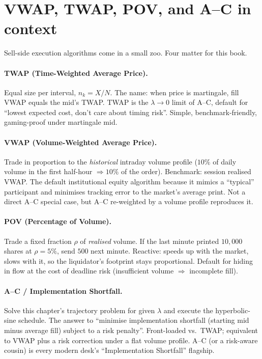 \section{VWAP, TWAP, POV, and A--C in context}
\label{sec:ac_taxonomy}

Sell-side execution algorithms come in a small zoo. Four matter
for this book.

\paragraph{TWAP (Time-Weighted Average Price).} Equal size
per interval, $n_k = X/N$. The name: when price is martingale, fill
VWAP equals the mid's TWAP. TWAP is the $\lambda \to 0$ limit of
A--C, default for ``lowest expected cost, don't care about timing
risk''. Simple, benchmark-friendly, gaming-proof under martingale
mid.

\paragraph{VWAP (Volume-Weighted Average Price).} Trade in
proportion to the \emph{historical} intraday volume profile ($10\%$
of daily volume in the first half-hour $\Rightarrow 10\%$ of the
order). Benchmark: session realised VWAP. The default institutional
equity algorithm because it mimics a ``typical'' participant and
minimises tracking error to the market's average print. Not a
direct A--C special case, but A--C re-weighted by a volume profile
reproduces it.

\paragraph{POV (Percentage of Volume).} Trade a fixed fraction
$\rho$ of \emph{realised} volume. If the last minute printed
$10{,}000$ shares at $\rho = 5\%$, send $500$ next minute. Reactive:
speeds up with the market, slows with it, so the liquidator's
footprint stays proportional. Default for hiding in flow at the
cost of deadline risk (insufficient volume $\Rightarrow$ incomplete
fill).

\paragraph{A--C / Implementation Shortfall.} Solve this chapter's
trajectory problem for given $\lambda$ and execute the
hyperbolic-sine schedule. The answer to ``minimise implementation
shortfall (starting mid minus average fill) subject to a risk
penalty''. Front-loaded vs.\ TWAP; equivalent to VWAP plus a risk
correction under a flat volume profile. A--C (or a risk-aware
cousin) is every modern desk's ``Implementation Shortfall''
flagship.

